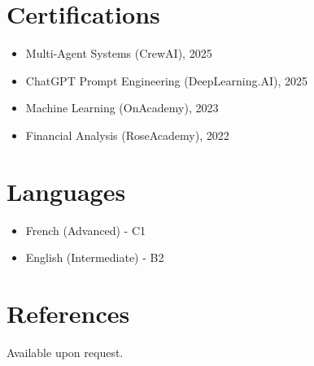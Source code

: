 \documentclass[11pt,a4paper]{article}
\begin{document}
\section*{Certifications}
\begin{itemize}
  \item Multi-Agent Systems (CrewAI), 2025
  \item ChatGPT Prompt Engineering (DeepLearning.AI), 2025
  \item Machine Learning (OnAcademy), 2023
  \item Financial Analysis (RoseAcademy), 2022
\end{itemize}

\section*{Languages}
\begin{itemize}
  \item French (Advanced) - C1
  \item English (Intermediate) - B2
\end{itemize}

\section*{References}
Available upon request.
\end{document}
